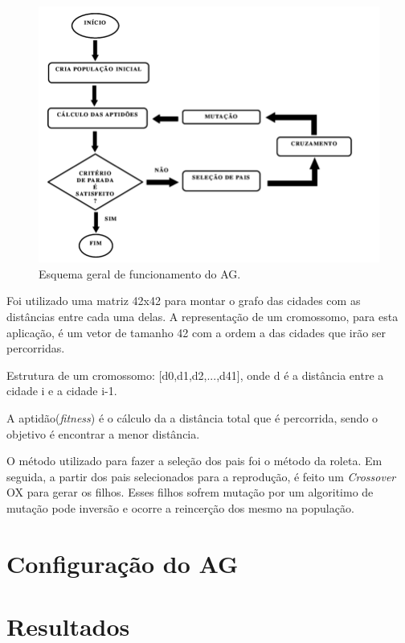 \documentclass[
article,			%
11pt,				%
oneside,			%
a4paper,			%
english,			%
brazil,				%
sumario=tradicional
]{article}
\begin{document}
	\begin{figure}[H]
		\centering
		\includegraphics[width=1\textwidth]{Figuras/funcionamento-ag.png}
		\caption{Esquema geral de funcionamento do AG.}
	\end{figure}

	Foi utilizado uma matriz 42x42 para montar o grafo das cidades com as distâncias entre cada uma delas. 
	A representação de um cromossomo, para esta aplicação, é um vetor de tamanho 42 com a ordem a das cidades que irão ser percorridas. 
	
	Estrutura de um cromossomo: [d0,d1,d2,...,d41], onde d é a distância entre a cidade i e a cidade i-1.
	
	A aptidão(\textit{fitness}) é o cálculo da a distância total que é percorrida, sendo o objetivo é encontrar a menor distância.
	
	O método utilizado para fazer a seleção dos pais foi o método da roleta. Em seguida, a partir dos pais selecionados para a reprodução, é feito um \textit{Crossover} OX para gerar os filhos. Esses filhos sofrem mutação por um algoritimo de mutação pode inversão e ocorre a reincerção dos mesmo na população.
	
	
	\section{Configuração do AG}
	


	\section{Resultados}
\end{document}
